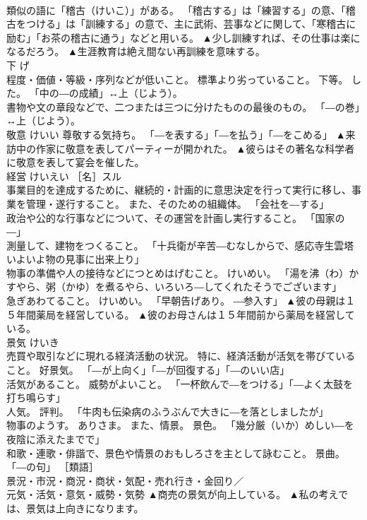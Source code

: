 \documentclass[8pt]{extreport}
\begin{document}
\begin{CJK}{UTF8}{min}
\\	類似の語に「稽古（けいこ）」がある。 「稽古する」は「練習する」の意、「稽古をつける」は「訓練する」の意で、主に武術、芸事などに関して、「寒稽古に励む」「お茶の稽古に通う」などと用いる。	▲少し訓練すれば、その仕事は楽になるだろう。 ▲生涯教育は絶え間ない再訓練を意味する。
\\	下	げ	
\\	程度・価値・等級・序列などが低いこと。 標準より劣っていること。 下等。 した。 「中の―の成績」↔上（じよう）。 
\\	書物や文の章段などで、二つまたは三つに分けたものの最後のもの。 「―の巻」↔上（じよう）。	
\\	敬意	けいい	尊敬する気持ち。 「―を表する」「―を払う」「―をこめる」	▲来訪中の作家に敬意を表してパーティーが開かれた。 ▲彼らはその著名な科学者に敬意を表して宴会を催した。
\\	経営	けいえい	［名］スル 
\\	事業目的を達成するために、継続的・計画的に意思決定を行って実行に移し、事業を管理・遂行すること。 また、そのための組織体。 「会社を―する」 
\\	政治や公的な行事などについて、その運営を計画し実行すること。 「国家の―」 
\\	測量して、建物をつくること。 「十兵衛が辛苦―むなしからで、感応寺生雲塔いよいよ物の見事に出来上り」 
\\	物事の準備や人の接待などにつとめはげむこと。 けいめい。 「湯を沸（わ）かすやら、粥（かゆ）を煮るやら、いろいろ―してくれたそうでございます」 
\\	急ぎあわてること。 けいめい。 「早朝告げあり。 ―参入す」	▲彼の母親は１５年間薬局を経営している。 ▲彼のお母さんは１５年間前から薬局を経営している。
\\	景気	けいき	
\\	売買や取引などに現れる経済活動の状況。 特に、経済活動が活気を帯びていること。 好景気。 「―が上向く」「―が回復する」「―のいい店」 
\\	活気があること。 威勢がよいこと。 「一杯飲んで―をつける」「―よく太鼓を打ち鳴らす」 
\\	人気。 評判。 「牛肉も伝染病のふうぶんで大きに―を落としましたが」 
\\	物事のようす。 ありさま。 また、情景。 景色。 「幾分厳（いか）めしい―を夜陰に添えたまでで」 
\\	和歌・連歌・俳諧で、景色や情景のおもしろさを主として詠むこと。 景曲。 「―の句」 ［類語］
\\	景況・市況・商況・商状・気配・売れ行き・金回り／
\\	元気・活気・意気・威勢・気勢	▲商売の景気が向上している。 ▲私の考えでは、景気は上向きになります。

\end{CJK}
\end{document}

